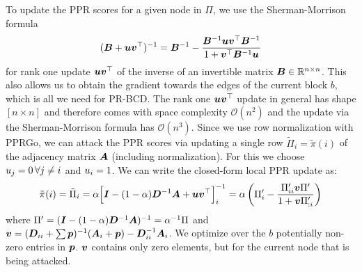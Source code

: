 \documentclass[sigconf, review]{acmart}
\begin{document}
To update the PPR scores for a given node in \(\Pi\), we use the Sherman-Morrison formula
\begin{equation}\label{eq:shermanmorrison}
    ({\bm{B}} + {\bm{u}}{\bm{v}}^\top)^{-1} = {\bm{B}}^{-1} - \frac{{\bm{B}}^{-1}{\bm{u}}{\bm{v}}^\top{\bm{B}}^{-1}}{1 + {\bm{v}}^\top{\bm{B}}^{-1}{\bm{u}}}
\end{equation}
for rank one update \({\bm{u}}{\bm{v}}^\top\) of the inverse of an invertible matrix \({\bm{B}} \in {\mathbb{R}}^{n \times n}\). This also allows us to obtain the gradient towards the edges of the current block \(b\), which is all we need for PR-BCD. The rank one \({\bm{u}}{\bm{v}}^\top\) update in general has shape \([n \times n]\) and therefore comes with space complexity \(\mathcal{O}(n^2)\) and the update via the Sherman-Morrison formula has \(\mathcal{O}(n^3)\). Since we use row normalization with PPRGo, we can attack the PPR scores via updating a single row \(\tilde{\Pi}_i = \tilde{\pi}(i)\) of the adjacency matrix \({\bm{A}}\) (including normalization). For this we choose \({u}_j=0\,\forall j \ne i\) and \({u}_i=1\). We can write the closed-form local PPR update as:
%
\begin{equation}\label{eq:pprrowupdate}
    \tilde{\pi}(i) 
    = \tilde{\Pi}_i
    = \alpha \Big[ {\bm{I}} - (1-\alpha){\bm{D}}^{-1}{\bm{A}} +  {\bm{u}}{\bm{v}}^\top \Big]_i^{-1} 
    = \alpha \left( \Pi'_i - \frac{\Pi'_{ii} {\bm{v}} \Pi'}{1 + {\bm{v}} \Pi'_{:i}} \right)
\end{equation}
%
where \(\Pi' = ({\bm{I}} - (1-\alpha){\bm{D}}^{-1}{\bm{A}})^{-1} = \alpha^{-1}\Pi\) and \({\bm{v}} = ({\bm{D}}_{ii} + \sum {\bm{p}})^{-1} ({\bm{A}}_i + {\bm{p}}) - {\bm{D}}^{-1}_{ii} {\bm{A}}_i\). We optimize over the \(b\) potentially non-zero entries in \({\bm{p}}\). \({\bm{v}}\) contains only zero elements, but for the current node that is being attacked.
\end{document}
